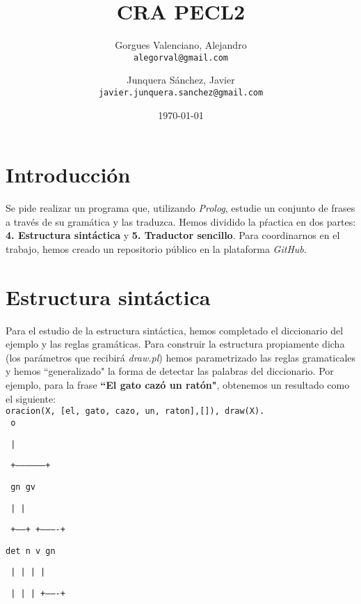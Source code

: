 \documentclass[a4paper]{article}
\title{CRA PECL2}
\author{Gorgues Valenciano, Alejandro\\
        \texttt{alegorval@gmail.com}
        \and
        Junquera Sánchez, Javier\\
        \texttt{javier.junquera.sanchez@gmail.com}
}
\date{\today}
\begin{document}
    \maketitle


    \obeyspaces

    \section*{Introducción}

    Se pide realizar un programa que, utilizando \emph{Prolog}, estudie un conjunto de frases a través de su gramática y las traduzca. Hemos dividido la pŕactica en dos partes: \textbf{4. Estructura sintáctica} y \textbf{5. Traductor sencillo}. Para coordinarnos en el trabajo, hemos creado un repositorio público en la plataforma \emph{GitHub}\cite{REPO}.

    \section*{Estructura sintáctica}

    Para el estudio de la estructura sintáctica, hemos completado el diccionario del ejemplo y las reglas gramáticas. Para construir la estructura propiamente dicha (los parámetros que recibirá \emph{draw.pl}) hemos parametrizado las reglas gramaticales y hemos ``generalizado" la forma de detectar las palabras del diccionario. Por ejemplo, para la frase \textbf{``El gato cazó un ratón"}, obtenemos un resultado como el siguiente:\\

        \texttt{oracion(X, [el, gato, cazo, un, raton],[]), draw(X).}\\

        \texttt{                   o}

        \texttt{                   |}

        \texttt{     +------------------+}

        \texttt{     gn                 gv}

        \texttt{     |                  |}

        \texttt{ +------+       +----------+}

        \texttt{det     n       v          gn}

        \texttt{ |      |       |          |}

        \texttt{ |      |       |      +-------+}
\end{document}
